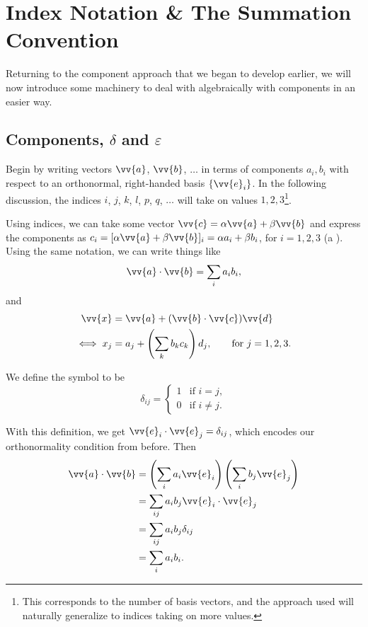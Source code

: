 \section{Index Notation \& The Summation Convention}

Returning to the component approach that we began to develop earlier, we will now introduce some machinery to deal with algebraically with components in an easier way.

\subsection{Components, $\delta$ and $\varepsilon$}

Begin by writing vectors $\vv{a}$, $\vv{b}$, $\dots$ in terms of components $a_i, b_i$ with respect to an orthonormal, right-handed basis $\{\vv{e}_i\}$. In the following discussion, the indices $i$, $j$, $k$, $l$, $p$, $q$, $\dots$ will take on values $1, 2, 3$\footnote{This corresponds to the number of basis vectors, and the approach used will naturally generalize to indices taking on more values.}.

Using indices, we can take some vector $\vv{c} = \alpha \vv{a} + \beta \vv{b}$ and express the components as $c_i = [\alpha \vv{a} + \beta \vv{b}]_i = \alpha a_i + \beta b_i$, for $i = 1, 2, 3$ (a ). Using the same notation, we can write things like
$$
\vv{a} \cdot \vv{b} = \sum_i a_i b_i,
$$
and
\begin{align*}
    \vv{x} &= \vv{a} + (\vv{b} \cdot \vv{c}) \vv{d} \\
\iff x_j &= a_j + \left(\sum_k b_k c_k\right) d_j, \quad \quad \text{for }j = 1, 2, 3.
\end{align*}

\begin{definition}
    We define the  symbol to be
    $$
    \delta_{ij} = \begin{cases}
        1 &\mbox{if } i = j, \\
        0 &\mbox{if } i \neq j.
       \end{cases}
    $$
\end{definition}

With this definition, we get $\vv{e}_i \cdot \vv{e}_j = \delta_{ij}$, which encodes our orthonormality condition from before. Then
\begin{align*}
    \vv{a} \cdot \vv{b} &= \left(\sum_i a_i \vv{e}_i\right)\left(\sum_i b_j \vv{e}_j\right) \\
    &= \sum_{ij} a_i b_j \vv{e}_i \cdot \vv{e}_j \\
    &= \sum_{ij} a_i b_j \delta_{ij} \\
    &= \sum_i a_i b_i.
\end{align*}

